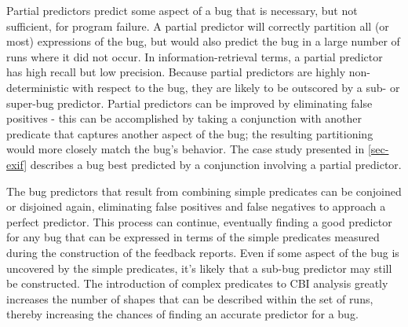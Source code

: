 Partial predictors predict some aspect of a bug that is necessary, but not sufficient, for program failure.  A partial predictor will correctly partition all (or most) expressions of the bug, but would also predict the bug in a large number of runs where it did not occur.  In information-retrieval terms, a partial predictor has high recall but low precision.  Because partial predictors are highly non-deterministic with respect to the bug, they are likely to be outscored by a sub- or super-bug predictor.  Partial predictors can be improved by eliminating false positives - this can be accomplished by taking a conjunction with another predicate that captures another aspect of the bug; the resulting partitioning would more closely match the bug's behavior.  The case study presented in \autoref{sec-exif} describes a bug best predicted by a conjunction involving a partial predictor.

The bug predictors that result from combining simple predicates can be conjoined or disjoined again, eliminating false positives and false negatives to approach a perfect predictor.  This process can continue, eventually finding a good predictor for any bug that can be expressed in terms of the simple predicates measured during the construction of the feedback reports.  Even if some aspect of the bug is uncovered by the simple predicates, it's likely that a sub-bug predictor may still be constructed.  The introduction of complex predicates to CBI analysis greatly increases the number of shapes that can be described within the set of runs, thereby increasing the chances of finding an accurate predictor for a bug.
